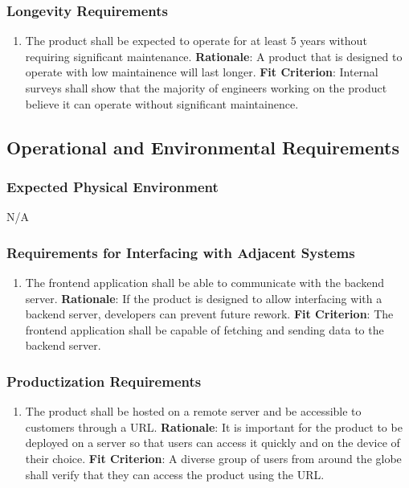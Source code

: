 \documentclass[12pt]{article}
\begin{document}
\subsubsection{Longevity Requirements}
\begin{enumerate}[nfr]
    \item The product shall be expected to operate for at least 5 years without requiring significant maintenance.
    \newline \textbf{Rationale}: A product that is designed to operate with low maintainence will last longer.
    \newline \textbf{Fit Criterion}: Internal surveys shall show that the majority of engineers working on the product believe it can operate without significant maintainence.
\end{enumerate}

\subsection{Operational and Environmental Requirements}
\subsubsection{Expected Physical Environment}
N/A

\subsubsection{Requirements for Interfacing with Adjacent Systems}
\begin{enumerate}[nfr]
    \item The frontend application shall be able to communicate with the backend server.
    \newline \textbf{Rationale}: If the product is designed to allow interfacing with a backend server, developers can prevent future rework.
    \newline \textbf{Fit Criterion}: The frontend application shall be capable of fetching and sending data to the backend server.
\end{enumerate}

\subsubsection{Productization Requirements}
\begin{enumerate}[nfr]
    \item The product shall be hosted on a remote server and be accessible to customers through a URL.
    \newline \textbf{Rationale}: It is important for the product to be deployed on a server so that users can access it quickly and on the device of their choice.
    \newline \textbf{Fit Criterion}: A diverse group of users from around the globe shall verify that they can access the product using the URL.
\end{enumerate}
\end{document}
